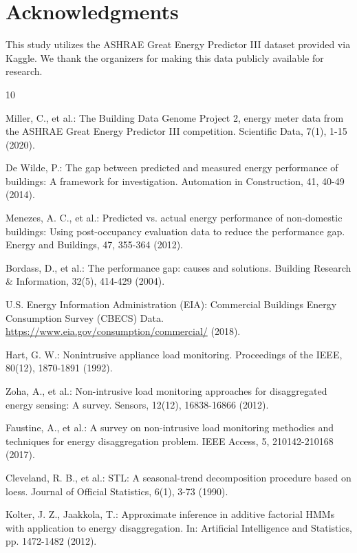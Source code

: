 \section*{Acknowledgments}
This study utilizes the ASHRAE Great Energy Predictor III dataset provided via Kaggle. We thank the organizers for making this data publicly available for research.

\begin{thebibliography}{10}

Miller, C., et al.: The Building Data Genome Project 2, energy meter data from the ASHRAE Great Energy Predictor III competition. Scientific Data, 7(1), 1-15 (2020).

De Wilde, P.: The gap between predicted and measured energy performance of buildings: A framework for investigation. Automation in Construction, 41, 40-49 (2014).

Menezes, A. C., et al.: Predicted vs. actual energy performance of non-domestic buildings: Using post-occupancy evaluation data to reduce the performance gap. Energy and Buildings, 47, 355-364 (2012).

Bordass, D., et al.: The performance gap: causes and solutions. Building Research \& Information, 32(5), 414-429 (2004).

U.S. Energy Information Administration (EIA): Commercial Buildings Energy Consumption Survey (CBECS) Data. \url{https://www.eia.gov/consumption/commercial/} (2018).

Hart, G. W.: Nonintrusive appliance load monitoring. Proceedings of the IEEE, 80(12), 1870-1891 (1992).

Zoha, A., et al.: Non-intrusive load monitoring approaches for disaggregated energy sensing: A survey. Sensors, 12(12), 16838-16866 (2012).

Faustine, A., et al.: A survey on non-intrusive load monitoring methodies and techniques for energy disaggregation problem. IEEE Access, 5, 210142-210168 (2017).

Cleveland, R. B., et al.: STL: A seasonal-trend decomposition procedure based on loess. Journal of Official Statistics, 6(1), 3-73 (1990).

Kolter, J. Z., Jaakkola, T.: Approximate inference in additive factorial HMMs with application to energy disaggregation. In: Artificial Intelligence and Statistics, pp. 1472-1482 (2012).


\end{thebibliography}
